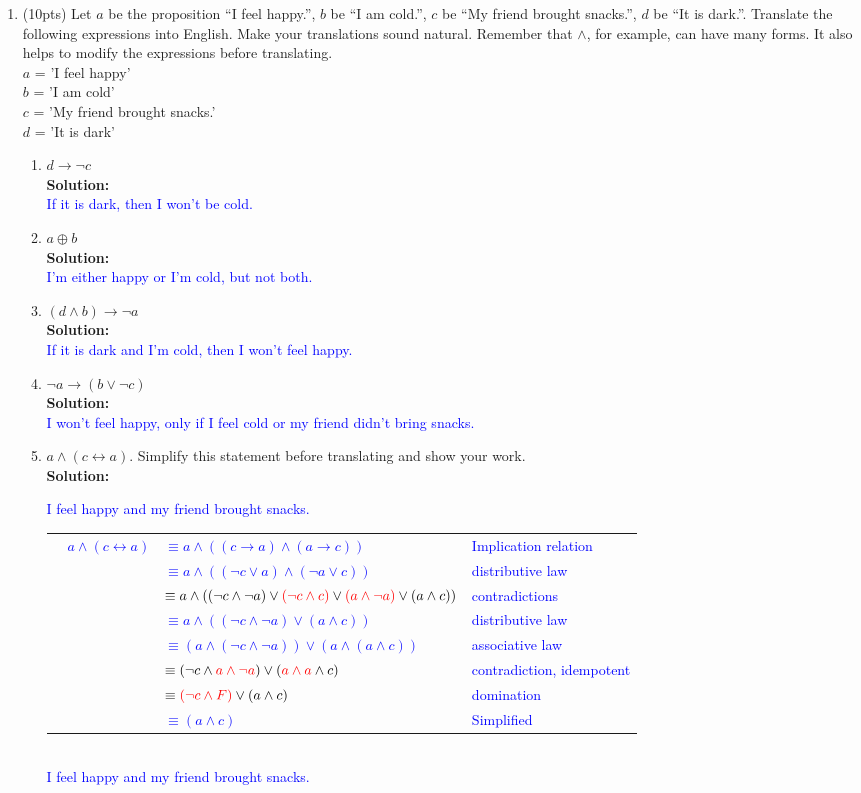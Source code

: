 \documentclass{article}
\renewcommand{\implies}{\rightarrow}
\newcommand{\xor}{\oplus}
\newcommand{\sol}[1]{\textbf{Solution:\,}\textcolor{blue}{#1}}
\begin{document}
\begin{enumerate}
\newpage

\item(10pts) Let $a$ be the proposition ``I feel happy.'', $b$ be ``I am cold.'', $c$ be ``My friend brought snacks.'', $d$ be ``It is dark.''.
Translate the following expressions into English. Make your translations sound natural. Remember that $\land$, for example, can have many forms. It also helps to modify the expressions before translating.
\\$a$ = 'I feel happy'
\\$b$ = 'I am cold'
\\$c$ = 'My friend brought snacks.'
\\$d$ = 'It is dark'
\begin{enumerate}
\item $d \implies \neg c$
\\\sol{\\If it is dark, then I won't be cold.}
\item $a \xor b$
\\\sol{\\I'm either happy or I'm cold, but not both.}
\item $(d \land b )\implies \neg a$
\\\sol{\\If it is dark and I'm cold, then I won't feel happy.}
\item $\neg a \implies (b \lor \neg c)$
\\\sol{\\I won't feel happy, only if I feel cold or my friend didn't bring snacks.}
\item $a  \land (c \leftrightarrow a)$. Simplify this statement before translating and show your work.
\\\sol{I feel happy and my friend brought snacks.
\\\begin{tabular}{llll}
&$a\land (c \leftrightarrow a)$&$\equiv a \land ((c \implies a) \land (a \implies c))$ &Implication relation\\
&&$\equiv a \land ((\neg c \lor a) \land (\neg a \lor c))$ &distributive law\\
&&$\equiv a \land ((\neg c \land \neg a) \lor \textcolor{red}{ (\neg c \land c)} \lor\textcolor{red}{ (a \land \neg a)}\lor (a \land c))$ & contradictions\\
&&$\equiv a \land ((\neg c \land \neg a) \lor (a \land c))$ & distributive law\\
&&$\equiv (a \land(\neg c \land \neg a)) \lor(a \land (a \land c))$ & associative law\\
&&$\equiv (\neg c \land \textcolor{red}{a \land \neg a} ) \lor(\textcolor{red}{a \land a} \land c)$& contradiction, idempotent\\
&&$\equiv \textcolor{red}{(\neg c \land F)} \lor(a \land c)$ & domination\\
&&$\equiv (a \land c)$ & Simplified\\
\end{tabular}
\\I feel happy and my friend brought snacks.}
\end{enumerate}


\end{enumerate}
\end{document}
